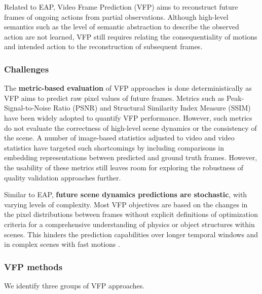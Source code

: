Related to EAP, Video Frame Prediction (VFP) aims to reconstruct future frames of ongoing actions from partial observations. Although high-level semantics such as the level of semantic abstraction to describe the observed action are not learned, VFP still requires relating the consequentiality of motions and intended action to the reconstruction of subsequent frames.

\subsubsection{Challenges}

The \textbf{metric-based evaluation} of VFP approaches is done deterministically as VFP aims to predict raw pixel values of future frames. Metrics such as Peak-Signal-to-Noise Ratio (PSNR) and Structural Similarity Index Measure (SSIM) have been widely adopted to quantify VFP performance. However, such metrics do not evaluate the correctness of high-level scene dynamics or the consistency of the scene. A number of image-based statistics adjusted to video \citep{czolbe2020loss,ding2020image,zhang2018unreasonable} and video statistics \citep{hou2022perceptual,li2019quality} have targeted such shortcomings by including comparisons in embedding representations between predicted and ground truth frames. However, the usability of these metrics still leaves room for exploring the robustness of quality validation approaches further.

Similar to EAP, \textbf{future scene dynamics predictions are stochastic}, with varying levels of complexity. Most VFP objectives are based on the changes in the pixel distributions between frames without explicit definitions of optimization criteria for a comprehensive understanding of physics or object structures within scenes. This hinders the prediction capabilities over longer temporal windows and in complex scenes with fast motions \citep{ming2024survey}.


\subsubsection{VFP methods}

We identify three groups of VFP approaches.

